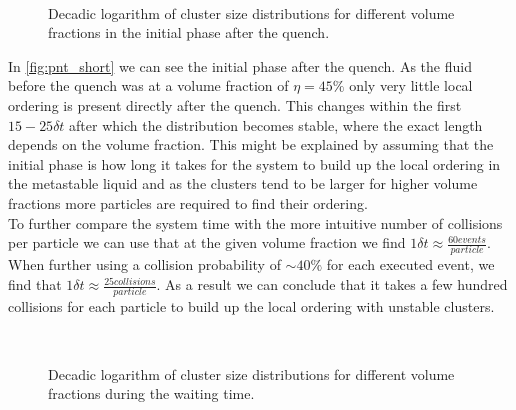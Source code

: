 \begin{figure}[ht]
\begin{center}
 \hspace{0.0cm}
\\
 \hspace{0.0cm}
\caption[Cluster size distributions over time after quench]{Decadic logarithm of cluster size distributions for different volume fractions in the initial phase after the quench.}
\label{fig:pnt_short}
\end{center}
\end{figure}

In \autoref{fig:pnt_short} we can see the initial phase after the quench. As the fluid before the quench was at a volume fraction of $\eta=45\%$ only very little local ordering is present directly after the quench. This changes within the first $15 -25 \delta t$ after which the distribution becomes stable, where the exact length depends on the volume fraction. This might be explained by assuming that the initial phase is how long it takes for the system to build up the local ordering in the metastable liquid and as the clusters tend to be larger for higher volume fractions more particles are required to find their ordering.\\   
To further compare the system time with the more intuitive number of collisions per particle we can use that at the given volume fraction we find  $1\delta t \approx \frac{60 events}{particle}$. When further using a collision probability of $\sim 40 \%$ for each executed event, we find that $1\delta t \approx \frac{25 collisions}{particle}$. As a result we can conclude that it takes a few hundred collisions for each particle to build up the local ordering with unstable clusters.\\

\begin{figure}[ht]
\begin{center}
 \hspace{0.0cm}
\\
 \hspace{0.0cm}
\caption[Cluster size distributions for long waiting times]{Decadic logarithm of cluster size distributions for different volume fractions during the waiting time.}
\label{fig:pnt_long}
\end{center}
\end{figure}

